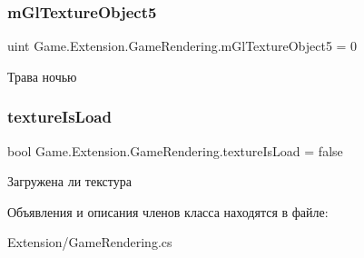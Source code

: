 \subsubsection{\texorpdfstring{m\+Gl\+Texture\+Object5}{mGlTextureObject5}}
{\footnotesize\ttfamily uint Game.\+Extension.\+Game\+Rendering.\+m\+Gl\+Texture\+Object5 = 0\hspace{0.3cm}{\ttfamily [static]}}



Трава ночью 

\mbox{\label{class_game_1_1_extension_1_1_game_rendering_a9748f6d2264411c2d27d6ed198defce6}} 
\subsubsection{\texorpdfstring{texture\+Is\+Load}{textureIsLoad}}
{\footnotesize\ttfamily bool Game.\+Extension.\+Game\+Rendering.\+texture\+Is\+Load = false\hspace{0.3cm}{\ttfamily [static]}}



Загружена ли текстура 



Объявления и описания членов класса находятся в файле\+:\begin{DoxyCompactItemize}
\item 
Extension/Game\+Rendering.\+cs\end{DoxyCompactItemize}
